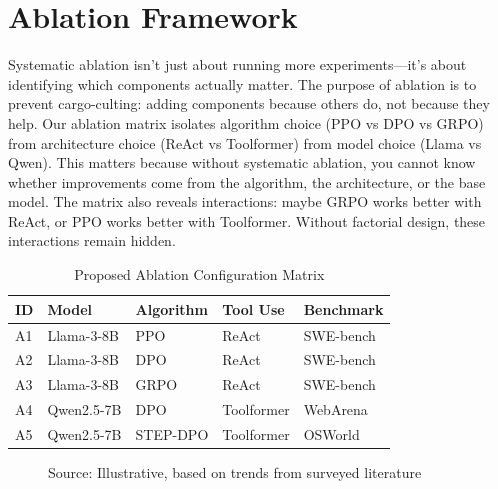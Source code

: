 \documentclass[12pt,a4paper]{report}
\theoremstyle{definition}
\newcommand{\source}[1]{\vspace{-0.5\baselineskip}\caption*{\small Source: #1}}
\begin{document}
\section{Ablation Framework}
Systematic ablation isn't just about running more experiments—it's about identifying which components actually matter. The purpose of ablation is to prevent cargo-culting: adding components because others do, not because they help. Our ablation matrix isolates algorithm choice (PPO vs DPO vs GRPO) from architecture choice (ReAct vs Toolformer) from model choice (Llama vs Qwen). This matters because without systematic ablation, you cannot know whether improvements come from the algorithm, the architecture, or the base model. The matrix also reveals interactions: maybe GRPO works better with ReAct, or PPO works better with Toolformer. Without factorial design, these interactions remain hidden.

\begin{table}[h]
\centering
\caption{Proposed Ablation Configuration Matrix}
\label{tab:ablation}
\begin{tabular}{lllll}
\toprule
\textbf{ID} & \textbf{Model} & \textbf{Algorithm} & \textbf{Tool Use} & \textbf{Benchmark} \\
\midrule
A1 & Llama-3-8B & PPO & ReAct & SWE-bench \\
A2 & Llama-3-8B & DPO & ReAct & SWE-bench \\
A3 & Llama-3-8B & GRPO & ReAct & SWE-bench \\
A4 & Qwen2.5-7B & DPO & Toolformer & WebArena \\
A5 & Qwen2.5-7B & STEP-DPO & Toolformer & OSWorld \\
\bottomrule
\end{tabular}
\end{table}

\begin{figure}[htbp]
\centering
{}
\caption{Illustrative training curves comparing PPO, DPO, and GRPO on agentic benchmarks. Based on trends reported in \cite{deepseek2025r1, rafailov2023direct}, GRPO typically converges faster and reaches higher task success on verifiable tasks because its lighter memory footprint lets practitioners crank up batch sizes.}
\label{fig:algorithm_comparison}
\source{Illustrative, based on trends from surveyed literature}
\end{figure}
\end{document}
